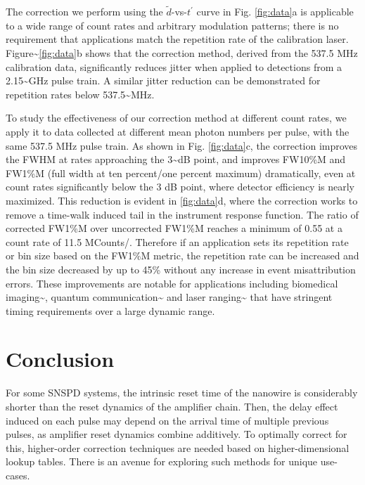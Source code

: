 \documentclass[11pt]{caltech_thesis} %
\begin{document}
The correction we perform using the $\tilde{d}$-vs-$t^\prime$ curve in
Fig. \ref{fig:data}a is applicable to a wide range of count rates and
arbitrary modulation patterns; there is no requirement that applications
match the repetition rate of the calibration laser.
Figure\textasciitilde{}\ref{fig:data}b shows that the correction method,
derived from the 537.5 MHz calibration data, significantly reduces
jitter when applied to detections from a 2.15\textasciitilde GHz pulse
train. A similar jitter reduction can be demonstrated for repetition
rates below 537.5\textasciitilde MHz.

To study the effectiveness of our correction method at different count
rates, we apply it to data collected at different mean photon numbers
per pulse, with the same 537.5 MHz pulse train. As shown in Fig.
\ref{fig:data}c, the correction improves the FWHM at rates approaching
the 3\textasciitilde dB point, and improves FW10\%M and FW1\%M (full
width at ten percent/one percent maximum) dramatically, even at count
rates significantly below the 3 dB point, where detector efficiency is
nearly maximized. This reduction is evident in \ref{fig:data}d, where
the correction works to remove a time-walk induced tail in the
instrument response function. The ratio of corrected FW1\%M over
uncorrected FW1\%M reaches a minimum of 0.55 at a count rate of 11.5
MCounts/. Therefore if an application sets its repetition rate or bin
size based on the FW1\%M metric, the repetition rate can be increased
and the bin size decreased by up to 45\% without any increase in event
misattribution errors. These improvements are notable for applications
including biomedical
imaging\textasciitilde{}\cite{Sutin16, Bruschini2019}, quantum
communication\textasciitilde{}\cite{Hadfield2009} and laser
ranging\textasciitilde{}\cite{McCarthy13} that have stringent timing
requirements over a large dynamic range.

\hypertarget{conclusion}{%
\section{Conclusion}\label{conclusion}}

For some SNSPD systems, the intrinsic reset time of the nanowire is
considerably shorter than the reset dynamics of the amplifier chain.
Then, the delay effect induced on each pulse may depend on the arrival
time of multiple previous pulses, as amplifier reset dynamics combine
additively. To optimally correct for this, higher-order correction
techniques are needed based on higher-dimensional lookup tables. There
is an avenue for exploring such methods for unique use-cases.
\end{document}
